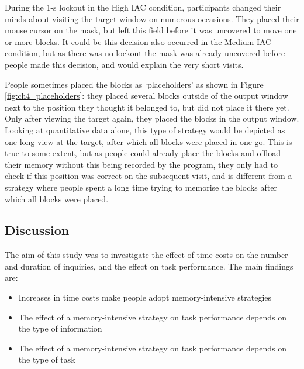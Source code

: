 During the 1-s lockout in the High IAC condition, participants changed their minds about visiting the target window on numerous occasions. They placed their mouse cursor on the mask, but left this field before it was uncovered to move one or more blocks. It could be this decision also occurred in the Medium IAC condition, but as there was no lockout the mask was already uncovered before people made this decision, and would explain the very short visits.

People sometimes placed the blocks as `placeholders' as shown in Figure \ref{fig:ch4_placeholders}: they placed several blocks outside of the output window next to the position they thought it belonged to, but did not place it there yet. Only after viewing the target again, they placed the blocks in the output window. Looking at quantitative data alone, this type of strategy would be depicted as one long view at the target, after which all blocks were placed in one go. This is true to some extent, but as people could already place the blocks and offload their memory without this being recorded by the program, they only had to check if this position was correct on the subsequent visit, and is different from a strategy where people spent a long time trying to memorise the blocks after which all blocks were placed.

\newpage

\subsection{Discussion}
The aim of this study was to investigate the effect of time costs on the number and duration of inquiries, and the effect on task performance. The main findings are:

\begin{itemize}
\item
Increases in time costs make people adopt memory-intensive strategies
\item
The effect of a memory-intensive strategy on task performance depends on the type of information
\item
The effect of a memory-intensive strategy on task performance depends on the type of task
\end{itemize}


